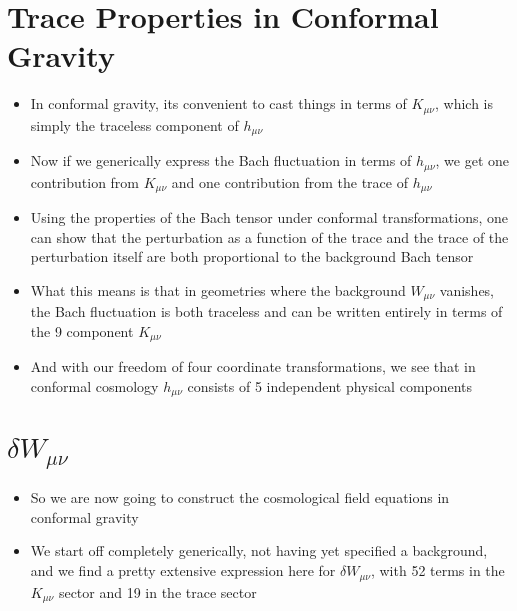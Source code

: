 \documentclass[10pt,letterpaper]{article}
\numberwithin{equation}{section}
\begin{document}
\section{Trace Properties in Conformal Gravity}
\begin{itemize}
	\item In conformal gravity, its convenient to cast things in terms of $K_{\mu\nu}$, which is simply the traceless component of $h_{\mu\nu}$
	\item Now if we generically express the Bach fluctuation in terms of $h_{\mu\nu}$, we get one contribution from $K_{\mu\nu}$ and one contribution from the trace of $h_{\mu\nu}$
	\item Using the properties of the Bach tensor under conformal transformations, one can show that the perturbation as a function of the trace and the trace of the perturbation itself are both proportional to the background Bach tensor
	\item What this means is that in geometries where the background $W_{\mu\nu}$ vanishes, the Bach fluctuation is both traceless and can be written entirely in terms of the 9 component $K_{\mu\nu}$
	\item And with our freedom of four coordinate transformations, we see that in conformal cosmology $h_{\mu\nu}$ consists of 5 independent physical components
\end{itemize}


\section{$\delta W_{\mu\nu}$}
\begin{itemize}
	\item So we are now going to construct the cosmological field equations in conformal gravity
	\item We start off completely generically, not having yet specified a background, and we find a pretty extensive expression here for $\delta W_{\mu\nu}$, with 52 terms in the $K_{\mu\nu}$ sector and 19 in the trace sector
\end{itemize}

\end{document}
